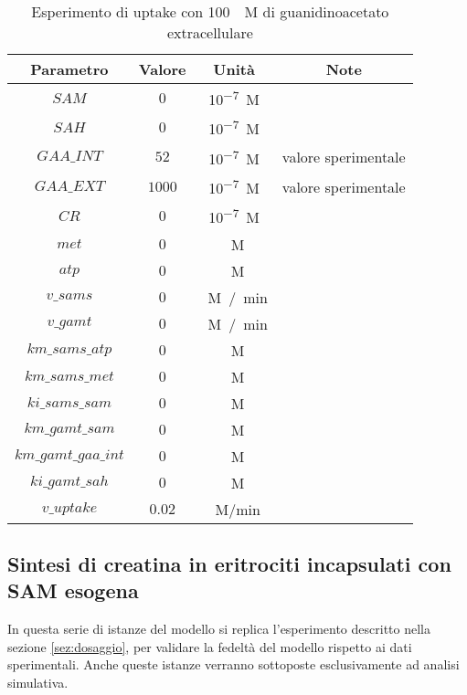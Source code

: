 \begin{table}[H]
	\centering
	\begin{tabular}{| c | c | c | c |}
	\hline
	Parametro & Valore & Unit\`a & Note \\
		\hline
		$SAM$ & $0$ & \si{10^{-7} M} & \\
		\hline
		$SAH$ & $0$ & \si{10^{-7} M} & \\
		\hline
		$GAA\_INT$ & $52$ & \si{10^{-7} M} & valore sperimentale \\
		\hline
		$GAA\_EXT$ & $1000$ & \si{10^{-7} M} & valore sperimentale \\
		\hline
		$CR$ & $0$ & \si{10^{-7} M} & \\
		\hline
		$met$ & $0$ & \si{\mu M} & \\
		\hline
		$atp$ & $0$ & \si{\mu M} & \\
		\hline
		$v\_sams$ & $0$ & \si{\mu M / min} & \\
		\hline
		$v\_gamt$ & $0$ & \si{\mu M / min} & \\
		\hline
		$km\_sams\_atp$ & $0$ & \si{\mu M} & \\
		\hline
		$km\_sams\_met$ & $0$ & \si{\mu M} & \\
		\hline
		$ki\_sams\_sam$ & $0$ & \si{\mu M} & \\
		\hline
		$km\_gamt\_sam$ & $0$ & \si{\mu M} & \\
		\hline
		$km\_gamt\_gaa\_int$ & $0$ & \si{\mu M} & \\
		\hline
		$ki\_gamt\_sah$ & $0$ & \si{\mu M} & \\
		\hline
		$v\_uptake$ & $0.02$ & \si{\mu M/min} & \\
		\hline
	\end{tabular}
	\caption{Esperimento di uptake con \SI{100}{\mu M} di guanidinoacetato extracellulare}
	\label{mod:4}
\end{table}

\subsection{Sintesi di creatina in eritrociti incapsulati con SAM esogena}
In questa serie di istanze del modello si replica l'esperimento descritto nella sezione \ref{sez:dosaggio}, per validare la fedelt\`a del modello rispetto ai dati sperimentali.
Anche queste istanze verranno sottoposte esclusivamente ad analisi simulativa.

